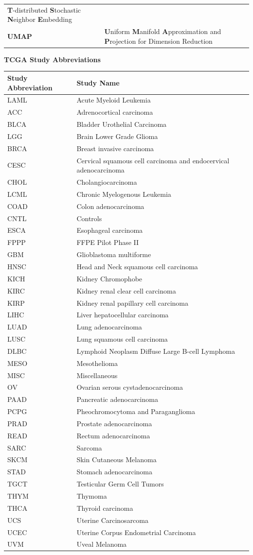 \documentclass[12pt,]{book}
\theoremstyle{definition}
\theoremstyle{definition}
\theoremstyle{definition}
\theoremstyle{remark}
\begin{document}
\begin{longtable}[]{@{}ll@{}}
\begin{minipage}[t]{0.80\columnwidth}
\textbf{T}-distributed \textbf{S}tochastic \textbf{N}eighbor
\textbf{E}mbedding\strut
\end{minipage}\tabularnewline
\begin{minipage}[t]{0.14\columnwidth}\raggedright
\textbf{UMAP}\strut
\end{minipage} & \begin{minipage}[t]{0.80\columnwidth}\raggedright
\textbf{U}niform \textbf{M}anifold \textbf{A}pproximation and
\textbf{P}rojection for Dimension Reduction\strut
\end{minipage}\tabularnewline
\bottomrule
\end{longtable}

\newpage\thispagestyle{empty}

\vskip 1cm \huge{\textbf{TCGA Study Abbreviations}} \vskip 1cm \small{}

\begin{longtable}[]{@{}ll@{}}
\toprule
Study Abbreviation & Study Name\tabularnewline
\midrule
\endhead
LAML & Acute Myeloid Leukemia\tabularnewline
ACC & Adrenocortical carcinoma\tabularnewline
BLCA & Bladder Urothelial Carcinoma\tabularnewline
LGG & Brain Lower Grade Glioma\tabularnewline
BRCA & Breast invasive carcinoma\tabularnewline
CESC & Cervical squamous cell carcinoma and endocervical
adenocarcinoma\tabularnewline
CHOL & Cholangiocarcinoma\tabularnewline
LCML & Chronic Myelogenous Leukemia\tabularnewline
COAD & Colon adenocarcinoma\tabularnewline
CNTL & Controls\tabularnewline
ESCA & Esophageal carcinoma\tabularnewline
FPPP & FFPE Pilot Phase II\tabularnewline
GBM & Glioblastoma multiforme\tabularnewline
HNSC & Head and Neck squamous cell carcinoma\tabularnewline
KICH & Kidney Chromophobe\tabularnewline
KIRC & Kidney renal clear cell carcinoma\tabularnewline
KIRP & Kidney renal papillary cell carcinoma\tabularnewline
LIHC & Liver hepatocellular carcinoma\tabularnewline
LUAD & Lung adenocarcinoma\tabularnewline
LUSC & Lung squamous cell carcinoma\tabularnewline
DLBC & Lymphoid Neoplasm Diffuse Large B-cell Lymphoma\tabularnewline
MESO & Mesothelioma\tabularnewline
MISC & Miscellaneous\tabularnewline
OV & Ovarian serous cystadenocarcinoma\tabularnewline
PAAD & Pancreatic adenocarcinoma\tabularnewline
PCPG & Pheochromocytoma and Paraganglioma\tabularnewline
PRAD & Prostate adenocarcinoma\tabularnewline
READ & Rectum adenocarcinoma\tabularnewline
SARC & Sarcoma\tabularnewline
SKCM & Skin Cutaneous Melanoma\tabularnewline
STAD & Stomach adenocarcinoma\tabularnewline
TGCT & Testicular Germ Cell Tumors\tabularnewline
THYM & Thymoma\tabularnewline
THCA & Thyroid carcinoma\tabularnewline
UCS & Uterine Carcinosarcoma\tabularnewline
UCEC & Uterine Corpus Endometrial Carcinoma\tabularnewline
UVM & Uveal Melanoma\tabularnewline
\bottomrule
\end{longtable}
\end{document}

